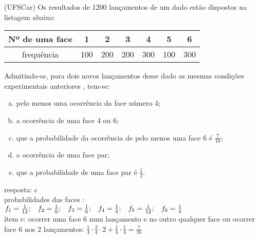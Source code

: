 \begin{ex}
 (UFSCar) Os resultados de 1200 lançamentos de um dado estão dispostos na listagem abaixo:

\begin{center}
\begin{tabular}{|c|c|c|c|c|c|c|}   \hline
Nº de uma face & 1   & 2   & 3   &   4 &   5 & 6  \\ \hline  
frequência     & 100 & 200 & 200 & 300 & 100 & 300 \\  \hline
\end{tabular} 
\end{center}

Admitindo-se, para dois novos  lançamentos  desse dado as mesmas condições experimentais anteriores , tem-se: 
    \begin{enumerate}[(a)]
    \item pelo menos uma ocorrência da face número 4;
    \item a ocorrência de uma face 4 ou 6;
    \item que a probabilidade da ocorrência de pelo menos uma face 6 é $\frac{7}{16}$;
    \item a ocorrência de uma face par;
    \item que a probabilidade de uma face par é $\frac{1}{2}$.
    \end{enumerate}
      \begin{sol}
       resposta: c \\
       probabilidades das faces : $f_1=\frac{1}{12};\hspace{0,3cm}
       f_2 =\frac{1}{6};\hspace{0,3cm}
       f_3 =\frac{1}{6};\hspace{0,3cm}
       f_4 = \frac{1}{4};\hspace{0,3cm}
       f_5 = \frac{1}{12};\hspace{0,3cm}
       f_6 = \frac{1}{4}$ \\
        ítem c: ocorrer uma face 6 num lançamento e no outro qualquer face ou ocorrer face 6 nos 2 lançamentos:
       $\frac{1}{4}\cdot\frac{3}{4}\cdot2+\frac{1}{4}\cdot\frac{1}{4}=\frac{7}{16}$
       
      \end{sol}
\end{ex}